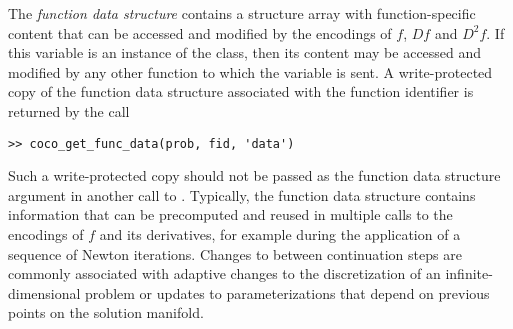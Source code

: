 The \emph{function data structure}  contains a structure array with function-specific content that can be accessed and modified by the encodings of $f$, $Df$ and $D^2f$. If this variable is an instance of the  class, then its content may be accessed and modified by any other function to which the variable is sent. A write-protected copy of the function data structure associated with the function identifier  is returned by the call
\begin{lstlisting}[language=coco-highlight]
>> coco_get_func_data(prob, fid, 'data')
\end{lstlisting}
Such a write-protected copy should not be passed as the function data structure argument in another call to . Typically, the function data structure contains information that can be precomputed and reused in multiple calls to the encodings of $f$ and its derivatives, for example during the application of a sequence of Newton iterations. Changes to  between continuation steps are commonly associated with adaptive changes to the discretization of an infinite-dimensional problem or updates to parameterizations that depend on previous points on the solution manifold. 

